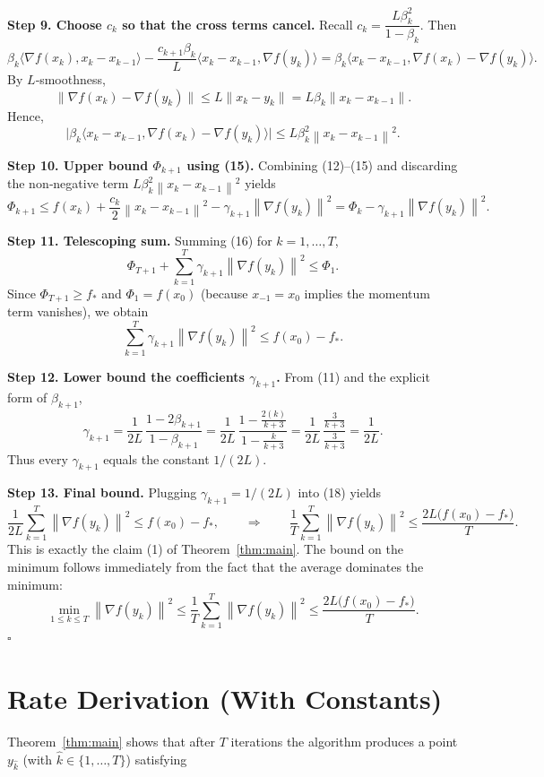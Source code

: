 \documentclass{article}
\newcommand{\norm}[1]{\left\lVert#1\right\rVert}
\newcommand{\grad}{\nabla}
\begin{document}
\noindent\textbf{Step 9.  Choose $c_k$ so that the cross terms cancel.}  
Recall $c_k = \dfrac{L\beta_k^{2}}{1-\beta_k}$.  Then
\[
\beta_k\langle\grad f(x_k),x_k-x_{k-1}\rangle
   -\frac{c_{k+1}\beta_k}{L}\langle x_k-x_{k-1},\grad f(y_k)\rangle
 =\beta_k\langle x_k-x_{k-1},\grad f(x_k)-\grad f(y_k)\rangle .
\tag{14}
\]
By $L$‑smoothness,
\[
\|\grad f(x_k)-\grad f(y_k)\|\le L\|x_k-y_k\|
   =L\beta_k\|x_k-x_{k-1}\|.
\]
Hence,
\[
\bigl|\beta_k\langle x_k-x_{k-1},\grad f(x_k)-\grad f(y_k)\rangle\bigr|
   \le L\beta_k^{2}\norm{x_k-x_{k-1}}^{2}.
\tag{15}
\]

\noindent\textbf{Step 10.  Upper bound $\Phi_{k+1}$ using (15).}  
Combining (12)–(15) and discarding the non‑negative term
$L\beta_k^{2}\norm{x_k-x_{k-1}}^{2}$ yields
\[
\Phi_{k+1}
\le f(x_k)+\frac{c_k}{2}\norm{x_k-x_{k-1}}^{2}
      -\gamma_{k+1}\norm{\grad f(y_k)}^{2}
= \Phi_k -\gamma_{k+1}\norm{\grad f(y_k)}^{2}.
\tag{16}
\]

\noindent\textbf{Step 11.  Telescoping sum.}  
Summing (16) for $k=1,\dots,T$,
\[
\Phi_{T+1} + \sum_{k=1}^{T}\gamma_{k+1}\norm{\grad f(y_k)}^{2}
   \le \Phi_{1}.
\tag{17}
\]
Since $\Phi_{T+1}\ge f_*$ and $\Phi_{1}=f(x_{0})$ (because $x_{-1}=x_{0}$ implies
the momentum term vanishes), we obtain
\[
\sum_{k=1}^{T}\gamma_{k+1}\norm{\grad f(y_k)}^{2}
   \le f(x_{0})-f_* .
\tag{18}
\]

\noindent\textbf{Step 12.  Lower bound the coefficients $\gamma_{k+1}$.}  
From (11) and the explicit form of $\beta_{k+1}$,
\[
\gamma_{k+1}
 =\frac{1}{2L}\,\frac{1-2\beta_{k+1}}{1-\beta_{k+1}}
 =\frac{1}{2L}\,\frac{1-\frac{2(k)}{k+3}}{1-\frac{k}{k+3}}
 =\frac{1}{2L}\,\frac{\frac{3}{k+3}}{\frac{3}{k+3}}
 =\frac{1}{2L}.
\tag{19}
\]
Thus every $\gamma_{k+1}$ equals the constant $1/(2L)$.

\noindent\textbf{Step 13.  Final bound.}  
Plugging $\gamma_{k+1}=1/(2L)$ into (18) yields
\[
\frac{1}{2L}\sum_{k=1}^{T}\norm{\grad f(y_k)}^{2}
   \le f(x_{0})-f_*,
\qquad\Longrightarrow\qquad
\frac{1}{T}\sum_{k=1}^{T}\norm{\grad f(y_k)}^{2}
   \le \frac{2L\bigl(f(x_{0})-f_*\bigr)}{T}.
\tag{20}
\]
This is exactly the claim (1) of Theorem~\ref{thm:main}.  The bound on the
minimum follows immediately from the fact that the average dominates the
minimum:
\[
\min_{1\le k\le T}\norm{\grad f(y_k)}^{2}
\le \frac{1}{T}\sum_{k=1}^{T}\norm{\grad f(y_k)}^{2}
\le \frac{2L\bigl(f(x_{0})-f_*\bigr)}{T}.
\tag{21}
\]
\hfill $\square$

\section*{Rate Derivation (With Constants)}
Theorem~\ref{thm:main} shows that after $T$ iterations the algorithm
produces a point $y_{\hat{k}}$ (with $\hat{k}\in\{1,\dots,T\}$) satisfying  
\end{document}
